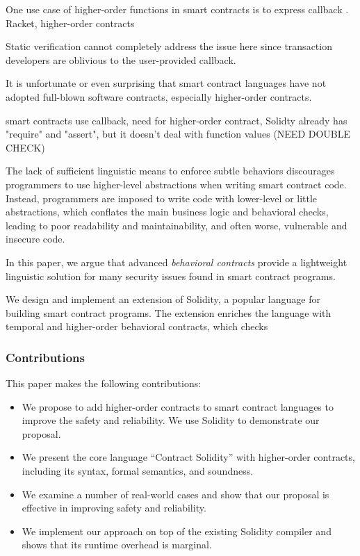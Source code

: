 \documentclass[acmsmall,review,anonymous]{acmart}\settopmatter{printfolios=true,printccs=false,printacmref=false}
\begin{document}
One  use case of higher-order functions in smart contracts is
to express callback .
Racket, higher-order contracts

Static verification cannot completely address the issue here since
transaction developers are oblivious to the user-provided callback.

It is unfortunate or even surprising that smart contract languages have not
adopted full-blown software contracts, especially higher-order contracts.

smart contracts use callback, need for higher-order contract,
  Solidty already has "require" and "assert", but it doesn't deal with function
  values (NEED DOUBLE CHECK)

The lack of sufficient linguistic means to enforce subtle behaviors discourages
programmers to use higher-level abstractions when writing smart contract code.
Instead, programmers are imposed to write code with lower-level or little
abstractions, which conflates the main business logic and behavioral checks,
leading to poor readability and maintainability, and often worse, vulnerable
and insecure code.

In this paper, we argue that advanced \emph{behavioral contracts} provide a lightweight
linguistic solution for many security issues found in smart contract programs.

We design and implement an extension of Solidity, a popular language for building
smart contract programs. The extension enriches the language with temporal
and higher-order behavioral contracts, which checks 

\subsubsection*{Contributions} This paper makes the following contributions:
\begin{itemize}
  \item We propose to add higher-order contracts to smart contract languages to
    improve the safety and reliability. We use Solidity to demonstrate our
    proposal.
  \item We present the core language ``Contract Solidity'' with higher-order
    contracts, including its syntax, formal semantics, and soundness.
  \item We examine a number of real-world cases and show that our proposal
    is effective in improving safety and reliability.
  \item We implement our approach on top of the existing Solidity compiler and shows
    that its runtime overhead is marginal.
\end{itemize}
\end{document}
